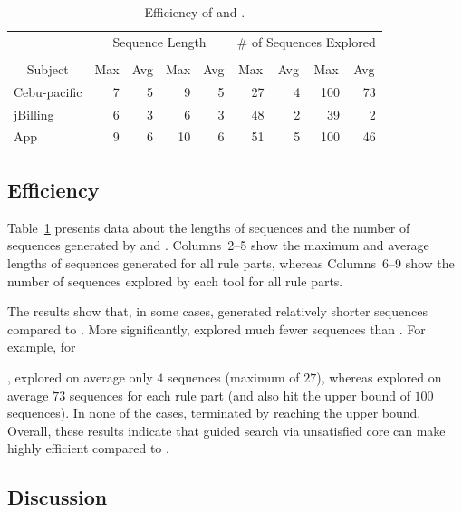 \begin{table}[t]
\caption{Efficiency of \tool{} and \exhaust{}.}
\centering
{\scriptsize
\tabcolsep=3pt
\begin{tabular}{|l|r|r|r|r|r|r|r|r|}
\hline
& \multicolumn{4}{|c|}{Sequence Length} & \multicolumn{4}{|c|}{\# of Sequences Explored} \\
\cline{2-9}
& \multicolumn{2}{|c|}{\tool{}} & \multicolumn{2}{|c|}{\exhaust{}} & \multicolumn{2}{|c|}{\tool{}} & \multicolumn{2}{|c|}{\exhaust{}}  \\
\cline{2-9}
\multicolumn{1}{|c|}{Subject} & \multicolumn{1}{|c|}{Max} & \multicolumn{1}{|c|}{Avg} & \multicolumn{1}{|c|}{Max} & \multicolumn{1}{|c|}{Avg} & \multicolumn{1}{|c|}{Max} & \multicolumn{1}{|c|}{Avg} & \multicolumn{1}{|c|}{Max} & \multicolumn{1}{|c|}{Avg} \\
\hline \hline
Cebu-pacific 	 &  7		& 5 &  9 &  5	 &  27 &  4	&  100 & 73 \\
jBilling		 	 &  6		& 3 &  6 &  3	 &  48 &  2	&  39  &  2 \\
App					 	 &  9		& 6 & 10 &  6	 &  51 &  5	& 100  & 46 \\
\hline
\end{tabular}
}
\label{tab:stats}
\end{table}

\subsection{Efficiency}

Table~\ref{tab:stats} presents data about the lengths of sequences and the
number of sequences generated by \tool{} and \exhaust{}. Columns~2--5 show the
maximum and average lengths of sequences generated for all rule parts, whereas
Columns~6--9 show the number of sequences explored by each tool for all rule
parts.

The results show that, in some cases, \tool{} generated relatively shorter
sequences compared to \exhaust{}. More significantly, \tool{} explored much
fewer sequences than \exhaust{}. For example, for \subject{Cebu-pacific},
\tool{} explored on average only $4$ sequences (maximum of $27$), whereas
\exhaust{} explored on average $73$ sequences for each rule part (and also hit
the upper bound of $100$ sequences). In none of the cases, \tool{} terminated by
reaching the upper bound. Overall, these results indicate that guided search via
unsatisfied core can make \tool{} highly efficient compared to \exhaust{}.

\subsection{Discussion}

